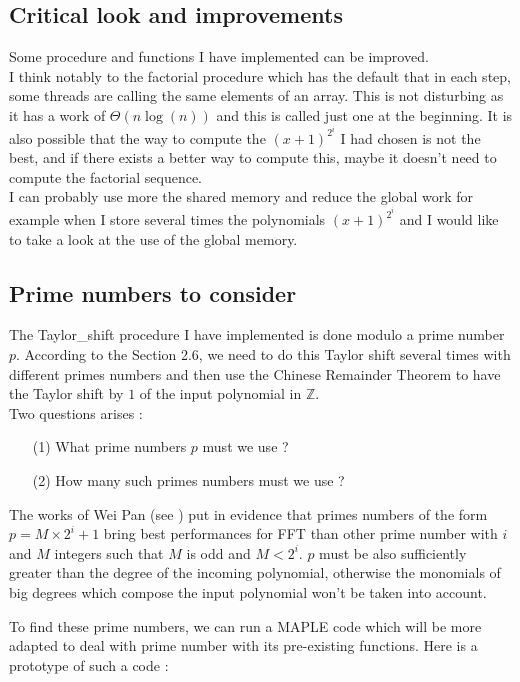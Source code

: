 \subsection{Critical look and improvements}
Some procedure and functions I have implemented can be improved. \\

I think notably to the factorial procedure which has the default that in each step, some threads are calling the same elements of an array. This is not disturbing as it has a work of $\Theta(n\log(n))$ and this is called just one at the beginning. It is also possible that the way to compute the $(x+1)^{2^i}$ I had chosen is not the best, and if there exists a better way to compute this, maybe it doesn't need to compute the factorial sequence. \\

I can probably use more the shared memory and reduce the global work for example when I store several times the polynomials $(x+1)^{2^i}$ and I would like to take a look at the use of the global memory.


\subsection{Prime numbers to consider}
The Taylor\_shift procedure I have implemented is done modulo a prime number $p$. According to the Section 2.6, we need to do this Taylor shift several times with different primes numbers and then use the Chinese Remainder Theorem to have the Taylor shift by $1$ of the input polynomial in $\mathbb{Z}$. \\

Two questions arises :\\
\begin{itemize}
\item[(1)] What prime numbers $p$ must we use ?
\item[(2)] How many such primes numbers must we use ?
\end{itemize}

The works of Wei Pan (see \cite{Wei}) put in evidence that primes numbers of the form $p = M\times 2^i + 1$ bring best performances for FFT than other prime number with $i$ and $M$ integers such that $M$ is odd and $M < 2^i$. $p$ must be also sufficiently greater than the degree of the incoming polynomial, otherwise the monomials of big degrees which compose the input polynomial won't be taken into account.

To find these prime numbers, we can run a MAPLE code which will be more adapted to deal with prime number with its pre-existing functions. Here is a prototype of such a code : \\

